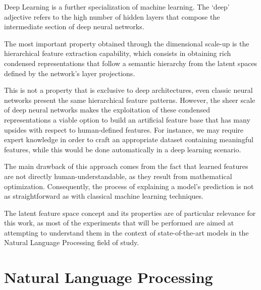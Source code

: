 Deep Learning is a further specialization of machine learning.
The `deep' adjective refers to the high number of hidden layers that compose the intermediate section of deep neural networks.

The most important property obtained through the dimensional scale-up is the hierarchical feature extraction capability, which consists in obtaining rich condensed representations that follow a semantic hierarchy from the latent spaces defined by the network's layer projections.

\begin{figure}[H]
    \centering
    \quad
    \caption{}
    \label{fig:background_fex_deep-fex}
\end{figure}

This is not a property that is exclusive to deep architectures, even classic neural networks present the same hierarchical feature patterns.
However, the sheer scale of deep neural networks makes the exploitation of these condensed representations a viable option to build an artificial feature base that has many upsides with respect to human-defined features.
For instance, we may require expert knowledge in order to craft an appropriate dataset containing meaningful features, while this would be done automatically in a deep learning scenario.

The main drawback of this approach comes from the fact that learned features are not directly human-understandable, as they result from mathematical optimization.
Consequently, the process of explaining a model's prediction is not as straightforward as with classical machine learning techniques.

The latent feature space concept and its properties are of particular relevance for this work, as most of the experiments that will be performed are aimed at attempting to understand them in the context of state-of-the-art models in the Natural Language Processing field of study.

\section{Natural Language Processing}

